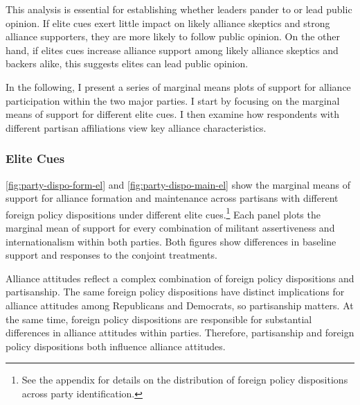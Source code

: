 \documentclass[12pt]{article}
\begin{document}
This analysis is essential for establishing whether leaders pander to or lead public opinion. 
If elite cues exert little impact on likely alliance skeptics and strong alliance supporters, they are more likely to follow public opinion. 
On the other hand, if elites cues increase alliance support among likely alliance skeptics and backers alike, this suggests elites can lead public opinion. 


In the following, I present a series of marginal means plots of support for alliance participation within the two major parties.  
I start by focusing on the marginal means of support for different elite cues. 
I then examine how respondents with different partisan affiliations view key alliance characteristics. 


\subsubsection{Elite Cues}

\autoref{fig:party-dispo-form-el} and \autoref{fig:party-dispo-main-el} show the marginal means of support for alliance formation and maintenance across partisans with different foreign policy dispositions under different elite cues.\footnote{See the appendix for details on the distribution of foreign policy dispositions across party identification.} 
Each panel plots the marginal mean of support for every combination of militant assertiveness and internationalism within both parties. 
Both figures show differences in baseline support and responses to the conjoint treatments. 


Alliance attitudes reflect a complex combination of foreign policy dispositions and partisanship. 
The same foreign policy dispositions have distinct implications for alliance attitudes among Republicans and Democrats, so partisanship matters.
At the same time, foreign policy dispositions are responsible for substantial differences in alliance attitudes within parties. 
Therefore, partisanship and foreign policy dispositions both influence alliance attitudes. 
\end{document}
